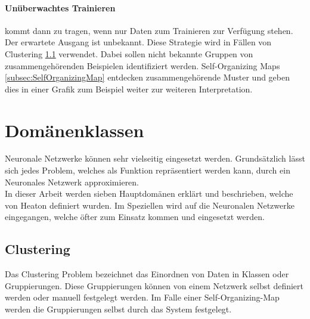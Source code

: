 \paragraph{Unüberwachtes Trainieren} kommt dann zu tragen, wenn nur Daten zum Trainieren zur Verfügung stehen.
Der erwartete Ausgang ist unbekannt.
Diese Strategie wird in Fällen von Clustering \ref{subsec:Clustering} verwendet.
Dabei sollen nicht bekannte Gruppen von zusammengehörenden Beispielen identifiziert werden. 
Self-Organizing Maps \ref{subsec:SelfOrganizingMap} entdecken zusammengehörende Muster und geben dies in einer Grafik zum Beispiel weiter zur weiteren Interpretation.

\section{Domänenklassen}
\label{sec:Domänenklassen}

Neuronale Netzwerke können sehr vielseitig eingesetzt werden. 
Grundsätzlich lässt sich jedes Problem, welches als Funktion repräsentiert werden kann, durch ein Neuronales Netzwerk approximieren. \\

\noindent
In dieser Arbeit werden sieben Hauptdomänen erklärt und beschrieben, welche von Heaton \cite{AI3} definiert wurden. %
Im Speziellen wird auf die Neuronalen Netzwerke eingegangen, welche öfter zum Einsatz kommen und eingesetzt werden.

\subsection{Clustering}
\label{subsec:Clustering}

Das Clustering Problem bezeichnet das Einordnen von Daten in Klassen oder Gruppierungen. 
Diese Gruppierungen können von einem Netzwerk selbst definiert werden oder manuell festgelegt werden. 
Im Falle einer Self-Organizing-Map werden die Gruppierungen selbst durch das System festgelegt.

